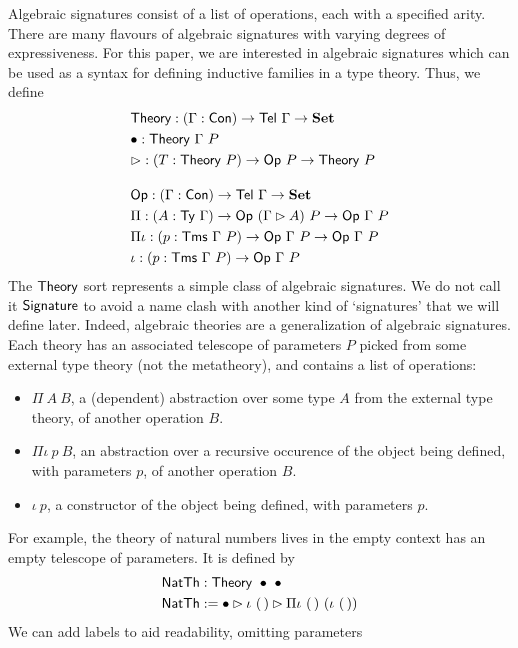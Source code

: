 Algebraic signatures consist of a list of operations, each with a specified
arity. There are many flavours of algebraic signatures with varying degrees of
expressiveness. For this paper, we are interested in algebraic signatures which can
be used as a syntax for defining inductive families in a type theory. Thus, we define
\begin{align*}
    &\mta{Theory} : (\Gamma : \Con) \to \mta{Tel}\ \Gamma \to \Set \\
    &\bullet : \mta{Theory}\ \Gamma\ P \\
    &\rhd : (T : \mta{Theory}\ P) \to \mta{Op}\ P \to \mta{Theory}\ P \\[1em]
    &\mta{Op} : (\Gamma : \Con) \to \mta{Tel}\ \Gamma \to \Set \\
    &\Pi : (A : \Ty\ \Gamma) \to \mta{Op}\ (\Gamma \rhd A)\ P \to \mta{Op}\ \Gamma\ P \\
    &\Pi\iota : (p : \Tms\ \Gamma\ P) \to \mta{Op}\ \Gamma\ P \to \mta{Op}\ \Gamma\ P \\
    &\iota : (p : \Tms\ \Gamma\ P) \to \mta{Op}\ \Gamma\ P
\end{align*}
The $\textsf{Theory}$ sort represents a simple class of algebraic signatures. We do
not call it $\textsf{Signature}$ to avoid a name clash with another kind of `signatures'
that we will define later. Indeed, algebraic theories are a generalization of
algebraic signatures. Each theory has an associated telescope of parameters $P$
picked from some external type theory (not the metatheory), and contains a list of operations:
\begin{itemize}
    \item $\Pi\ A\ B$, a (dependent) abstraction over some type $A$ from the
    external type theory, of another operation $B$. \item $\Pi\iota\ p\ B$, an
    abstraction over a recursive occurence of
    the object being defined, with parameters $p$, of another operation
    $B$.
    \item $\iota\ p$, a constructor of the object being defined, with parameters $p$.
\end{itemize}
For example, the theory of natural numbers lives in the empty context has an
empty telescope of parameters. It is defined by
\begin{align*}
	&\mta{NatTh} : \mta{Theory}\ \bullet\ \bullet \\
	&\mta{NatTh} := \bullet \rhd \iota\ (\,) \rhd \Pi\iota\ (\,)\ (\iota\ (\,))
\end{align*}
We can add labels to aid readability, omitting parameters
